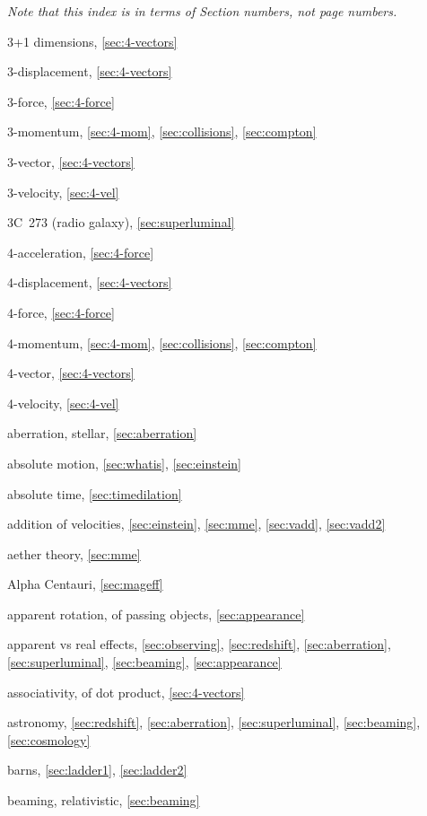 \cleardoublepage
\begin{theindex}
\raggedright
{\em Note that this index is in terms of Section numbers, not page numbers.}
\item 3+1 dimensions, \ref{sec:4-vectors}
\item 3-displacement, \ref{sec:4-vectors}
\item 3-force, \ref{sec:4-force}
\item 3-momentum, \ref{sec:4-mom}, \ref{sec:collisions}, \ref{sec:compton}
\item 3-vector, \ref{sec:4-vectors}
\item 3-velocity, \ref{sec:4-vel}
\item 3C~273 (radio galaxy), \ref{sec:superluminal}
\item 4-acceleration, \ref{sec:4-force}
\item 4-displacement, \ref{sec:4-vectors}
\item 4-force, \ref{sec:4-force}
\item 4-momentum, \ref{sec:4-mom}, \ref{sec:collisions}, \ref{sec:compton}
\item 4-vector, \ref{sec:4-vectors}
\item 4-velocity, \ref{sec:4-vel}
\item aberration, stellar, \ref{sec:aberration}
\item absolute motion, \ref{sec:whatis}, \ref{sec:einstein}
\item absolute time, \ref{sec:timedilation}
\item addition of velocities, \ref{sec:einstein}, \ref{sec:mme},
	\ref{sec:vadd}, \ref{sec:vadd2}
\item aether theory, \ref{sec:mme}
\item Alpha Centauri, \ref{sec:mageff}
\item apparent rotation, of passing objects, \ref{sec:appearance}
\item apparent vs real effects, \ref{sec:observing}, \ref{sec:redshift},
	\ref{sec:aberration}, \ref{sec:superluminal}, \ref{sec:beaming},
	\ref{sec:appearance}
\item associativity, of dot product, \ref{sec:4-vectors}
\item astronomy, \ref{sec:redshift}, \ref{sec:aberration},
	\ref{sec:superluminal}, \ref{sec:beaming}, \ref{sec:cosmology}
\item barns, \ref{sec:ladder1}, \ref{sec:ladder2}
\item beaming, relativistic, \ref{sec:beaming}

\end{theindex}
